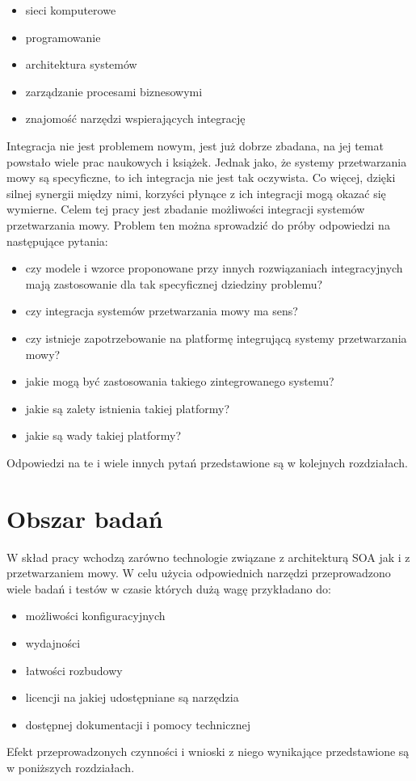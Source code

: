  \begin{itemize}
	\item sieci komputerowe
	\item programowanie
	\item architektura systemów
	\item zarządzanie procesami biznesowymi
	\item znajomość narzędzi wspierających integrację
\end{itemize}   
Integracja nie jest problemem nowym, jest już dobrze zbadana, na jej temat powstało wiele prac naukowych i książek. Jednak jako, że systemy przetwarzania mowy są specyficzne, to ich integracja nie jest tak oczywista. Co więcej, dzięki silnej synergii między nimi, korzyści płynące z ich integracji mogą okazać się wymierne. Celem tej pracy jest zbadanie możliwości integracji systemów przetwarzania mowy. Problem ten można sprowadzić do próby odpowiedzi na następujące pytania:
 \begin{itemize}
	\item  czy modele i wzorce proponowane przy innych rozwiązaniach integracyjnych mają zastosowanie dla tak specyficznej dziedziny problemu?
	\item  czy integracja systemów przetwarzania mowy ma sens?
	\item czy istnieje zapotrzebowanie na platformę integrującą systemy przetwarzania mowy?
	\item jakie mogą być zastosowania takiego zintegrowanego systemu?
	\item jakie są zalety istnienia takiej platformy?
	\item jakie są wady takiej platformy?
\end{itemize}  
Odpowiedzi na te i wiele innych pytań przedstawione są w kolejnych rozdziałach.

\section{Obszar badań} %
W skład  pracy wchodzą zarówno technologie związane z architekturą SOA jak i z przetwarzaniem mowy. W celu użycia odpowiednich narzędzi przeprowadzono wiele badań i testów w czasie których dużą wagę przykładano do:
\begin{itemize}
 	\item możliwości konfiguracyjnych
	\item wydajności
	\item łatwości rozbudowy
	\item licencji na jakiej udostępniane są narzędzia
	\item dostępnej dokumentacji i pomocy technicznej
\end{itemize}
Efekt przeprowadzonych czynności i wnioski z niego wynikające przedstawione są w poniższych rozdziałach.


